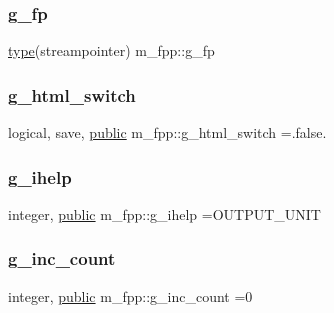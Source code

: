 \subsubsection{\texorpdfstring{g\+\_\+fp}{g\_fp}}
{\footnotesize\ttfamily \hyperlink{stop__watch_83_8txt_a70f0ead91c32e25323c03265aa302c1c}{type}(streampointer) m\+\_\+fpp\+::g\+\_\+fp}

\mbox{\label{namespacem__fpp_aa54b63082124b77a4beec31b6e702f7d}} 
\subsubsection{\texorpdfstring{g\+\_\+html\+\_\+switch}{g\_html\_switch}}
{\footnotesize\ttfamily logical, save, \hyperlink{M__stopwatch_83_8txt_a2f74811300c361e53b430611a7d1769f}{public} m\+\_\+fpp\+::g\+\_\+html\+\_\+switch =.false.}

\mbox{\label{namespacem__fpp_ae0b89e9d5583b98efa43c34378112eca}} 
\subsubsection{\texorpdfstring{g\+\_\+ihelp}{g\_ihelp}}
{\footnotesize\ttfamily integer, \hyperlink{M__stopwatch_83_8txt_a2f74811300c361e53b430611a7d1769f}{public} m\+\_\+fpp\+::g\+\_\+ihelp =O\+U\+T\+P\+U\+T\+\_\+\+U\+N\+IT}

\mbox{\label{namespacem__fpp_ac4ca8efb06bd0c3da1498d32f0425e3f}} 
\subsubsection{\texorpdfstring{g\+\_\+inc\+\_\+count}{g\_inc\_count}}
{\footnotesize\ttfamily integer, \hyperlink{M__stopwatch_83_8txt_a2f74811300c361e53b430611a7d1769f}{public} m\+\_\+fpp\+::g\+\_\+inc\+\_\+count =0}

\mbox{\label{namespacem__fpp_aaea061b982fcf2f3f3836c5411d931a1}} 
